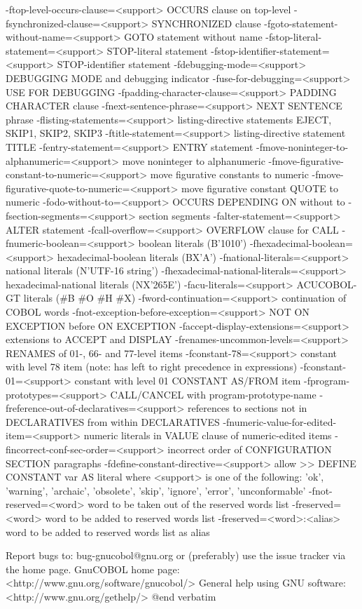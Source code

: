   -ftop-level-occurs-clause=<support>	OCCURS clause on top-level
  -fsynchronized-clause=<support>	SYNCHRONIZED clause
  -fgoto-statement-without-name=<support>	GOTO statement without name
  -fstop-literal-statement=<support>	STOP-literal statement
  -fstop-identifier-statement=<support>	STOP-identifier statement
  -fdebugging-mode=<support>	DEBUGGING MODE and debugging indicator
  -fuse-for-debugging=<support>	USE FOR DEBUGGING
  -fpadding-character-clause=<support>	PADDING CHARACTER clause
  -fnext-sentence-phrase=<support>	NEXT SENTENCE phrase
  -flisting-statements=<support>	listing-directive statements EJECT, SKIP1, SKIP2, SKIP3
  -ftitle-statement=<support>	listing-directive statement TITLE
  -fentry-statement=<support>	ENTRY statement
  -fmove-noninteger-to-alphanumeric=<support>	move noninteger to alphanumeric
  -fmove-figurative-constant-to-numeric=<support>	move figurative constants to numeric
  -fmove-figurative-quote-to-numeric=<support>	move figurative constant QUOTE to numeric
  -fodo-without-to=<support>	OCCURS DEPENDING ON without to
  -fsection-segments=<support>	section segments
  -falter-statement=<support>	ALTER statement
  -fcall-overflow=<support>	OVERFLOW clause for CALL
  -fnumeric-boolean=<support>	boolean literals (B'1010')
  -fhexadecimal-boolean=<support>	hexadecimal-boolean literals (BX'A')
  -fnational-literals=<support>	national literals (N'UTF-16 string')
  -fhexadecimal-national-literals=<support>	hexadecimal-national literals (NX'265E')
  -facu-literals=<support>	ACUCOBOL-GT literals (#B #O #H #X)
  -fword-continuation=<support>	continuation of COBOL words
  -fnot-exception-before-exception=<support>	NOT ON EXCEPTION before ON EXCEPTION
  -faccept-display-extensions=<support>	extensions to ACCEPT and DISPLAY
  -frenames-uncommon-levels=<support>	RENAMES of 01-, 66- and 77-level items
  -fconstant-78=<support>	constant with level 78 item (note: has left to right precedence in expressions)
  -fconstant-01=<support>	constant with level 01 CONSTANT AS/FROM item
  -fprogram-prototypes=<support>	CALL/CANCEL with program-prototype-name
  -freference-out-of-declaratives=<support>	references to sections not in DECLARATIVES from within DECLARATIVES
  -fnumeric-value-for-edited-item=<support>	numeric literals in VALUE clause of numeric-edited items
  -fincorrect-conf-sec-order=<support>	incorrect order of CONFIGURATION SECTION paragraphs
  -fdefine-constant-directive=<support>	allow >> DEFINE CONSTANT var AS literal
	where <support> is one of the following:
	'ok', 'warning', 'archaic', 'obsolete', 'skip', 'ignore', 'error', 'unconformable'
  -fnot-reserved=<word>  word to be taken out of the reserved words list
  -freserved=<word>      word to be added to reserved words list
  -freserved=<word>:<alias>	word to be added to reserved words list as alias


Report bugs to: bug-gnucobol@gnu.org
or (preferably) use the issue tracker via the home page.
GnuCOBOL home page: <http://www.gnu.org/software/gnucobol/>
General help using GNU software: <http://www.gnu.org/gethelp/>
@end verbatim
